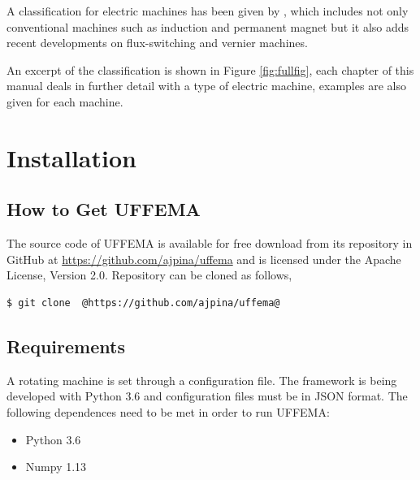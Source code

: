 \documentclass[justified]{tufte-book} %
\begin{document}
A classification for electric machines has been given by \cite{ktchau_2015}, which includes not only conventional machines such as induction and permanent magnet but it also adds recent developments on flux-switching and vernier machines.

An excerpt of the classification is shown in Figure \ref{fig:fullfig}, each chapter of this manual deals in further detail with a type of electric machine, examples are also given for each machine. 



\mainmatter



\chapter{Installation}
\label{ch:installation}

\section{How to Get UFFEMA}
\begin{fullwidth}
The source code of UFFEMA is available for free download from its repository in GitHub at \url{https://github.com/ajpina/uffema} and is licensed under the Apache License, Version 2.0. Repository can be cloned as follows,
\end{fullwidth}

\begin{lstlisting}[language=bash, escapeinside=@@]
$ git clone  @https://github.com/ajpina/uffema@
\end{lstlisting}

\section{Requirements}
\begin{fullwidth}
A rotating machine is set through a configuration file. The framework is being developed with Python 3.6 and configuration files must be in JSON format. The following dependences need to be met in order to run UFFEMA:
\end{fullwidth}
\begin{itemize}
\item Python 3.6
\item Numpy 1.13
\end{itemize}
\end{document}
